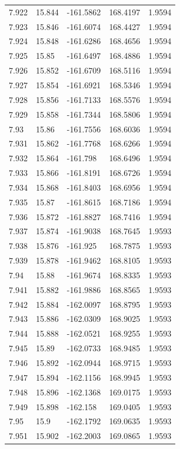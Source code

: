 \begin{tabular}{lllll}
7.922 & 15.844 & -161.5862 & 168.4197 & 1.9594 \\
7.923 & 15.846 & -161.6074 & 168.4427 & 1.9594 \\
7.924 & 15.848 & -161.6286 & 168.4656 & 1.9594 \\
7.925 & 15.85 & -161.6497 & 168.4886 & 1.9594 \\
7.926 & 15.852 & -161.6709 & 168.5116 & 1.9594 \\
7.927 & 15.854 & -161.6921 & 168.5346 & 1.9594 \\
7.928 & 15.856 & -161.7133 & 168.5576 & 1.9594 \\
7.929 & 15.858 & -161.7344 & 168.5806 & 1.9594 \\
7.93 & 15.86 & -161.7556 & 168.6036 & 1.9594 \\
7.931 & 15.862 & -161.7768 & 168.6266 & 1.9594 \\
7.932 & 15.864 & -161.798 & 168.6496 & 1.9594 \\
7.933 & 15.866 & -161.8191 & 168.6726 & 1.9594 \\
7.934 & 15.868 & -161.8403 & 168.6956 & 1.9594 \\
7.935 & 15.87 & -161.8615 & 168.7186 & 1.9594 \\
7.936 & 15.872 & -161.8827 & 168.7416 & 1.9594 \\
7.937 & 15.874 & -161.9038 & 168.7645 & 1.9593 \\
7.938 & 15.876 & -161.925 & 168.7875 & 1.9593 \\
7.939 & 15.878 & -161.9462 & 168.8105 & 1.9593 \\
7.94 & 15.88 & -161.9674 & 168.8335 & 1.9593 \\
7.941 & 15.882 & -161.9886 & 168.8565 & 1.9593 \\
7.942 & 15.884 & -162.0097 & 168.8795 & 1.9593 \\
7.943 & 15.886 & -162.0309 & 168.9025 & 1.9593 \\
7.944 & 15.888 & -162.0521 & 168.9255 & 1.9593 \\
7.945 & 15.89 & -162.0733 & 168.9485 & 1.9593 \\
7.946 & 15.892 & -162.0944 & 168.9715 & 1.9593 \\
7.947 & 15.894 & -162.1156 & 168.9945 & 1.9593 \\
7.948 & 15.896 & -162.1368 & 169.0175 & 1.9593 \\
7.949 & 15.898 & -162.158 & 169.0405 & 1.9593 \\
7.95 & 15.9 & -162.1792 & 169.0635 & 1.9593 \\
7.951 & 15.902 & -162.2003 & 169.0865 & 1.9593 \\

\end{tabular}
